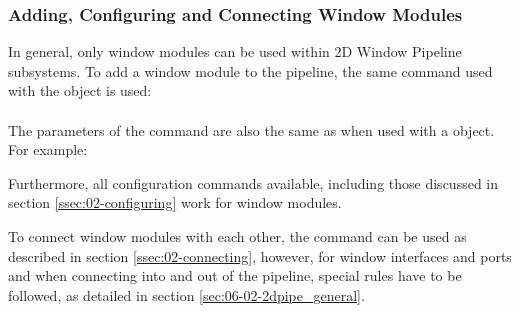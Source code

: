 \subsubsection{Adding, Configuring and Connecting Window Modules}

In general, only window modules can be used within 2D Window Pipeline subsystems.
To add a window module to the pipeline, the same command used with the  object is used:\\
\\
The parameters of the command are also the same as when used with a  object.
For example:\\

Furthermore, all configuration commands available, including those discussed in section \ref{ssec:02-configuring} work for window modules.

To connect window modules with each other, the  command can be used as described in section \ref{ssec:02-connecting}, however, for window interfaces and ports and when connecting into and out of the pipeline, special rules have to be followed, as detailed in section \ref{sec:06-02-2dpipe_general}.

